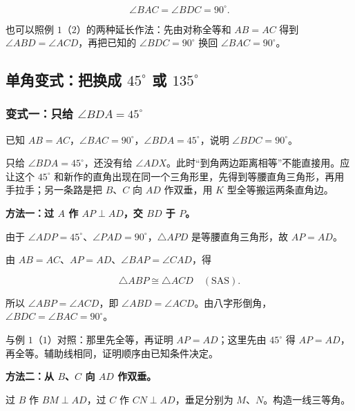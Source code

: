 \[
\angle BAC=\angle BDC=90^\circ.
\]

也可以照例 $1$（$2$）的两种延长作法：先由对称全等和 $AB=AC$ 得到 $\angle ABD=\angle ACD$，再把已知的 $\angle BDC=90^\circ$ 换回 $\angle BAC=90^\circ$。


\subsection{\texorpdfstring{单角变式：把换成 $45^\circ$ 或 $135^\circ$}{单角变式：把④换成 45° 或 135°}}

\subsubsection*{\texorpdfstring{变式一：只给 $\angle BDA=45^\circ$}{变式一：只给 ∠BDA＝45°}}

已知 $AB=AC$，$\angle BAC=90^\circ$，$\angle BDA=45^\circ$，说明 $\angle BDC=90^\circ$。

\think

只给 $\angle BDA=45^\circ$，还没有给 $\angle ADX$。此时“到角两边距离相等”不能直接用。应让这个 $45^\circ$ 和新作的直角出现在同一个三角形里，先得到等腰直角三角形，再用手拉手；另一条路是把 $B$、$C$ 向 $AD$ 作双垂，用 $K$ 型全等搬运两条直角边。

\textbf{方法一：过 $A$ 作 $AP\perp AD$，交 $BD$ 于 $P$。}

\esdiagram{\esdiHandLower}

由于 $\angle ADP=45^\circ$、$\angle PAD=90^\circ$，$\triangle APD$ 是等腰直角三角形，故 $AP=AD$。

由 $AB=AC$、$AP=AD$、$\angle BAP=\angle CAD$，得

\[
\triangle ABP\cong\triangle ACD\quad(\mathrm{SAS}).
\]

所以 $\angle ABP=\angle ACD$，即 $\angle ABD=\angle ACD$。由八字形倒角，$\angle BDC=\angle BAC=90^\circ$。

与例 $1$（$1$）对照：那里先全等，再证明 $AP=AD$；这里先由 $45^\circ$ 得 $AP=AD$，再全等。辅助线相同，证明顺序由已知条件决定。

\textbf{方法二：从 $B$、$C$ 向 $AD$ 作双垂。}

过 $B$ 作 $BM\perp AD$，过 $C$ 作 $CN\perp AD$，垂足分别为 $M$、$N$。构造一线三等角。

\esdiagram{\esdiKPerpendicular}

